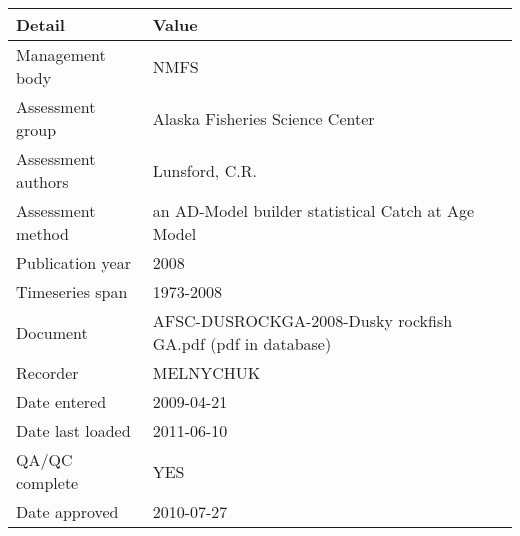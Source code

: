 \begin{table}[htb]
\centering
\begin{tabular}{lp{7cm}}
\toprule
Detail & Value \\
\midrule
Management body    & NMFS                                                        \\
Assessment group   & Alaska Fisheries Science Center                             \\
Assessment authors & Lunsford, C.R.                                              \\
Assessment method  & an AD-Model builder statistical Catch at Age Model          \\
Publication year   & 2008                                                        \\
Timeseries span    & 1973-2008                                                   \\
Document           & AFSC-DUSROCKGA-2008-Dusky rockfish GA.pdf (pdf in database) \\
Recorder           & MELNYCHUK                                                   \\
Date entered       & 2009-04-21                                                  \\
Date last loaded   & 2011-06-10                                                  \\
QA/QC complete     & YES                                                         \\
Date approved      & 2010-07-27                                                  \\
\bottomrule
\end{tabular}
\label{tab:assessdet}
\end{table}
